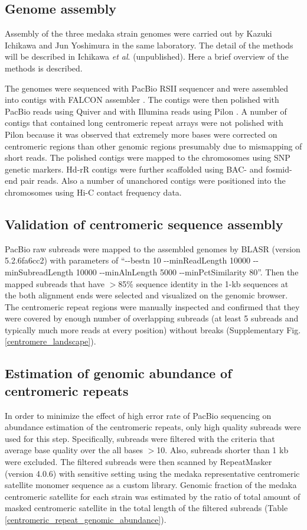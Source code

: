\subsection*{Genome assembly}
  Assembly of the three medaka strain genomes were carried out by Kazuki Ichikawa and Jun Yoshimura in the same laboratory. The detail of the methods will be described in Ichikawa \textit{et al}. (unpublished). Here a brief overview of the methods is described.

  The genomes were sequenced with PacBio RSII sequencer and were assembled into contigs with FALCON assembler \cite{Chin2016}. The contigs were then polished with PacBio reads using Quiver \cite{Chin2013} and with Illumina reads using Pilon \cite{Walker2014}. A number of contigs that contained long centromeric repeat arrays were not polished with Pilon because it was observed that extremely more bases were corrected on centromeric regions than other genomic regions presumably due to mismapping of short reads. The polished contigs were mapped to the chromosomes using SNP genetic markers. Hd-rR contigs were further scaffolded using BAC- and fosmid-end pair reads. Also a number of unanchored contigs were positioned into the chromosomes using Hi-C contact frequency data.


\subsection*{Validation of centromeric sequence assembly}
  PacBio raw subreads were mapped to the assembled genomes by BLASR (version 5.2.6fa6cc2) \cite{Chaisson2012} with parameters of ``{-}{-}bestn 10 {-}{-}minReadLength 10000 {-}{-}minSubreadLength 10000 {-}{-}minAlnLength 5000 {-}{-}minPctSimilarity 80''. Then the mapped subreads that have $>$85\% sequence identity in the 1-kb sequences at the both alignment ends were selected and visualized on the genomic browser. The centromeric repeat regions were manually inspected and confirmed that they were covered by enough number of overlapping subreads (at least 5 subreads and typically much more reads at every position) without breaks (Supplementary Fig. \ref{centromere_landscape}).


\subsection*{Estimation of genomic abundance of centromeric repeats}
  In order to minimize the effect of high error rate of PacBio sequencing on abundance estimation of the centromeric repeats, only high quality subreads were used for this step. Specifically, subreads were filtered with the criteria that average base quality over the all bases $>$10. Also, subreads shorter than 1 kb were excluded. The filtered subreads were then scanned by RepeatMasker (version 4.0.6) \cite{Smit} with sensitive setting using the medaka representative centromeric satellite monomer sequence as a custom library. Genomic fraction of the medaka centromeric satellite for each strain was estimated by the ratio of total amount of masked centromeric satellite in the total length of the filtered subreads (Table \ref{centromeric_repeat_genomic_abundance}).


